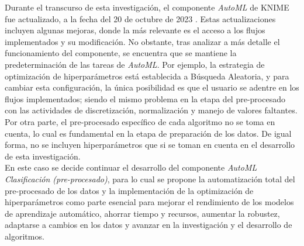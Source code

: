 \begin{table}[H]
\end{table}

Durante el transcurso de esta investigación, el componente \textit{AutoML} de KNIME fue actualizado, a la fecha del 20 de octubre de 2023 \citep{KNIME2023-11}. Estas actualizaciones incluyen algunas mejoras, donde la más relevante es el acceso a los flujos implementados y su modificación. No obstante, tras analizar a más detalle el funcionamiento del componente, se encuentra que se mantiene la predeterminación de las tareas de \textit{AutoML}. Por ejemplo, la estrategia de optimización de hiperparámetros está establecida a Búsqueda Aleatoria, y para cambiar esta configuración, la única posibilidad es que el usuario se adentre en los flujos implementados; siendo el mismo problema en la etapa del pre-procesado con las actividades de discretización, normalización y manejo de valores faltantes. Por otra parte, el pre-procesado específico de cada algoritmo no se toma en cuenta, lo cual es fundamental en la etapa de preparación de los datos. De igual forma, no se incluyen hiperparámetros que si se toman en cuenta en el desarrollo de esta investigación. \\
En este caso se decide continuar el desarrollo del componente \textit{AutoML Clasificación (pre-procesado)}, para lo cual se propone la automatización total del pre-procesado de los datos y la implementación de la optimización de hiperparámetros como parte esencial para mejorar el rendimiento de los modelos de aprendizaje automático, ahorrar tiempo y recursos, aumentar la robustez, adaptarse a cambios en los datos y avanzar en la investigación y el desarrollo de algoritmos.



